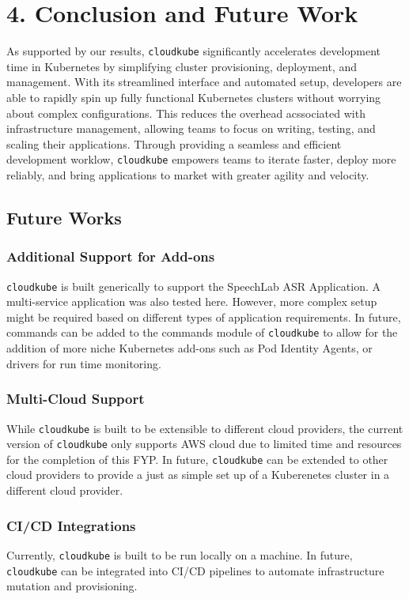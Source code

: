 
\chapter{4. Conclusion and Future Work}
As supported by our results, \texttt{cloudkube} significantly accelerates development time in Kubernetes by simplifying cluster provisioning, deployment,
and management. With its streamlined interface and automated setup, developers are able to rapidly spin up fully functional Kubernetes clusters without worrying
about complex configurations. This reduces the overhead acssociated with infrastructure management, allowing teams to focus on writing, testing, and scaling their applications.
Through providing a seamless and efficient development worklow, \texttt{cloudkube} empowers teams to iterate faster, deploy more reliably, and bring applications to market with greater agility and velocity. 


\section{Future Works}
\subsection{Additional Support for Add-ons}
\texttt{cloudkube} is built generically to support the SpeechLab ASR Application. A multi-service application was also tested here. However, more complex setup might 
be required based on different types of application requirements. In future, commands can be added to the commands module of \texttt{cloudkube} to allow for the 
addition of more niche Kubernetes add-ons such as Pod Identity Agents, or drivers for run time monitoring. 

\subsection{Multi-Cloud Support}
While \texttt{cloudkube} is built to be extensible to different cloud providers, the current version of \texttt{cloudkube} only supports AWS cloud due to limited
time and resources for the completion of this FYP. In future, \texttt{cloudkube} can be extended to other cloud providers to provide a just as simple set up of a Kuberenetes cluster
in a different cloud provider.

\subsection{CI/CD Integrations}
Currently, \texttt{cloudkube} is built to be run locally on a machine. In future, \texttt{cloudkube} can be integrated into CI/CD pipelines to automate infrastructure
mutation and provisioning. 

\newpage
